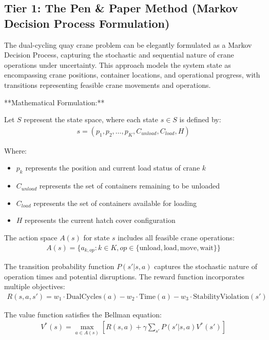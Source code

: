 \documentclass{article}
\begin{document}
\subsection{Tier 1: The Pen \& Paper Method (Markov Decision Process Formulation)}

The dual-cycling quay crane problem can be elegantly formulated as a Markov Decision Process, capturing the stochastic and sequential nature of crane operations under uncertainty. This approach models the system state as encompassing crane positions, container locations, and operational progress, with transitions representing feasible crane movements and operations.

**Mathematical Formulation:**

Let $S$ represent the state space, where each state $s \in S$ is defined by:
\begin{align}
s = (p_1, p_2, \ldots, p_K, C_{unload}, C_{load}, H)
\end{align}

Where:
\begin{itemize}
\item $p_k$ represents the position and current load status of crane $k$
\item $C_{unload}$ represents the set of containers remaining to be unloaded
\item $C_{load}$ represents the set of containers available for loading  
\item $H$ represents the current hatch cover configuration
\end{itemize}

The action space $A(s)$ for state $s$ includes all feasible crane operations:
\begin{align}
A(s) = \{a_{k,op} : k \in K, op \in \{\text{unload}, \text{load}, \text{move}, \text{wait}\}\}
\end{align}

The transition probability function $P(s'|s,a)$ captures the stochastic nature of operation times and potential disruptions. The reward function incorporates multiple objectives:
\begin{align}
R(s,a,s') = w_1 \cdot \text{DualCycles}(a) - w_2 \cdot \text{Time}(a) - w_3 \cdot \text{StabilityViolation}(s')
\end{align}

The value function satisfies the Bellman equation:
\begin{align}
V^*(s) = \max_{a \in A(s)} \left[ R(s,a) + \gamma \sum_{s'} P(s'|s,a) V^*(s') \right]
\end{align}
\end{document}
